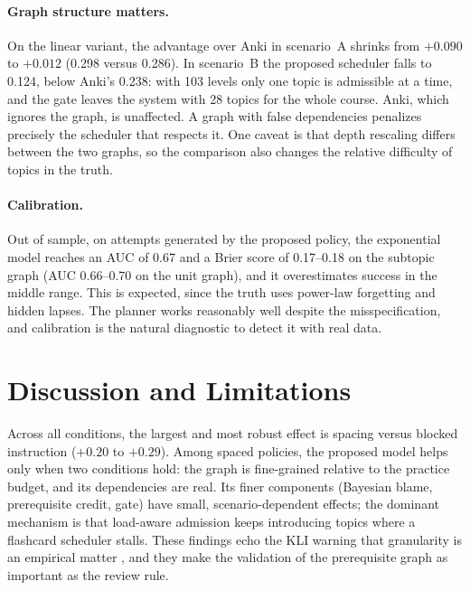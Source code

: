 \documentclass[runningheads]{llncs}
\begin{document}
\paragraph{Graph structure matters.} On the linear variant, the advantage over Anki in scenario~A shrinks from $+0.090$ to $+0.012$ (0.298 versus 0.286). In scenario~B the proposed scheduler falls to 0.124, below Anki's 0.238: with 103 levels only one topic is admissible at a time, and the gate leaves the system with 28 topics for the whole course. Anki, which ignores the graph, is unaffected. A graph with false dependencies penalizes precisely the scheduler that respects it. One caveat is that depth rescaling differs between the two graphs, so the comparison also changes the relative difficulty of topics in the truth.

\paragraph{Calibration.} Out of sample, on attempts generated by the proposed policy, the exponential model reaches an AUC of 0.67 and a Brier score of 0.17--0.18 on the subtopic graph (AUC 0.66--0.70 on the unit graph), and it overestimates success in the middle range. This is expected, since the truth uses power-law forgetting and hidden lapses. The planner works reasonably well despite the misspecification, and calibration is the natural diagnostic to detect it with real data.

\section{Discussion and Limitations}

Across all conditions, the largest and most robust effect is spacing versus blocked instruction ($+0.20$ to $+0.29$). Among spaced policies, the proposed model helps only when two conditions hold: the graph is fine-grained relative to the practice budget, and its dependencies are real. Its finer components (Bayesian blame, prerequisite credit, gate) have small, scenario-dependent effects; the dominant mechanism is that load-aware admission keeps introducing topics where a flashcard scheduler stalls. These findings echo the KLI warning that granularity is an empirical matter \cite{koedinger2012}, and they make the validation of the prerequisite graph as important as the review rule.
\end{document}
